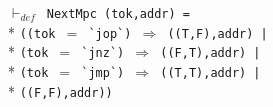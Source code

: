 \begin{normalsize}
\hspace*{\fill}
\begin{minipage}{17cm}
$\vdash_{def}$\verb" NextMpc (tok,addr) ="\\*
\verb"((tok "$=$\verb" `jop`) "$\Rightarrow$\verb" ((T,F),addr) |"\\*
\verb"(tok "$=$\verb" `jnz`) "$\Rightarrow$\verb" ((F,T),addr) |"\\*
\verb"(tok "$=$\verb" `jmp`) "$\Rightarrow$\verb" ((T,T),addr) |"\\*
\verb"((F,F),addr))"
\end{minipage}
\hspace*{\fill}


\end{normalsize}
